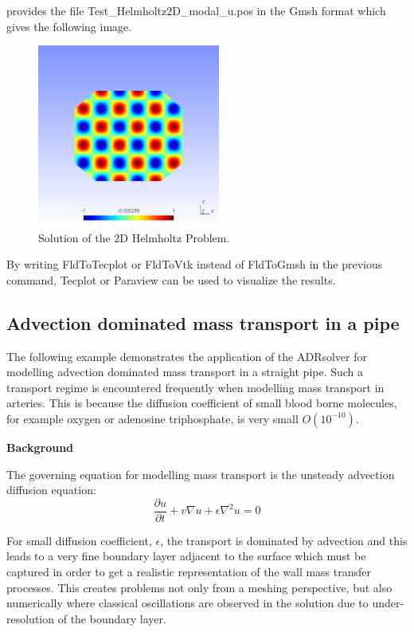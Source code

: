 \normalsize 
provides the file Test\_Helmholtz2D\_modal\_u.pos in the Gmsh format which gives the following image.
 
\begin{figure}[h!]
\begin{center}
\includegraphics[width=6cm]{Figures/Helmholtz2D}
\caption{Solution of the 2D Helmholtz Problem.}
\end{center}
\end{figure}

By writing FldToTecplot or FldToVtk instead of FldToGmsh in the previous command, Tecplot or Paraview can be used to visualize the results.

\subsection{Advection dominated mass transport in a pipe}

The following example demonstrates the application of the ADRsolver for modelling advection dominated mass transport in a straight pipe. 
Such a transport regime is encountered frequently when modelling mass transport in arteries. This is because the diffusion 
coefficient of small blood borne molecules, for example oxygen or adenosine triphosphate, is very small $O(10^{-10})$.

\textbf{Background}

The governing equation for modelling mass transport is the unsteady advection diffusion equation:
\begin{equation}
\dfrac{\partial u}{\partial t}  + v\nabla u +  \epsilon \nabla^2 u = 0
\end{equation}

For small diffusion coefficient, $\epsilon$, the transport is dominated by advection and this leads to a very fine boundary
 layer adjacent to the surface which must be captured in order to get a realistic representation of the wall mass transfer processes.
 This creates problems not only from a meshing perspective, but also numerically where classical oscillations 
 are observed in the solution due to under-resolution of the boundary layer.\\

